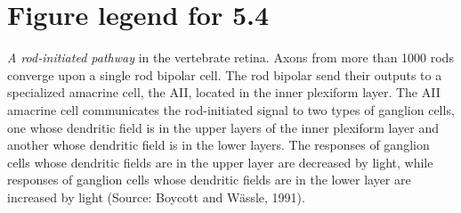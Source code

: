 


\doublesp

\section*{Figure legend for 5.4}

{\em A rod-initiated pathway}
in the vertebrate retina.
Axons from more than 1000 rods converge upon
a single rod bipolar cell.
The rod bipolar send their outputs to a specialized
amacrine cell, the AII, located in the inner plexiform layer.
The AII amacrine cell communicates the rod-initiated signal
to two types of ganglion cells, one whose dendritic field is in the
upper layers of the inner plexiform layer and another whose dendritic
field is in the lower layers.
The responses of ganglion cells whose dendritic fields are 
in the upper layer are decreased by light, while responses of
ganglion cells whose dendritic fields are in the lower layer
are increased by light (Source: Boycott and W\"assle, 1991).


